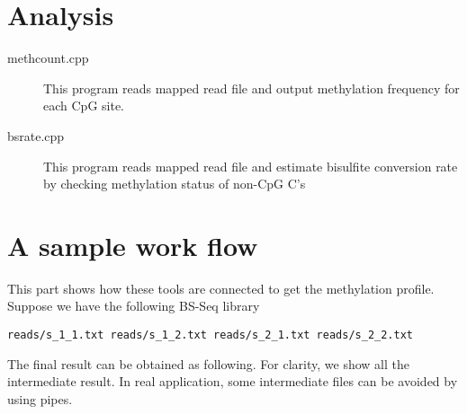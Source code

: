 \documentclass{article}
\begin{document}
\section{Analysis}
\label{sec:analysis}

\begin{description}
\item[methcount.cpp]
This program reads mapped read file and output methylation frequency
for each CpG site.

\item[bsrate.cpp]
This program reads mapped read file and estimate bisulfite conversion
rate by checking methylation status of non-CpG C's

\end{description}

\section{A sample work flow}
This part shows how these tools are connected to get the methylation
profile. Suppose we have the following BS-Seq library
\begin{verbatim}
reads/s_1_1.txt reads/s_1_2.txt reads/s_2_1.txt reads/s_2_2.txt
\end{verbatim}

The final result can be obtained as following. For clarity, we show
all the intermediate result. In real application, some intermediate
files can be avoided by using pipes.
\end{document}
